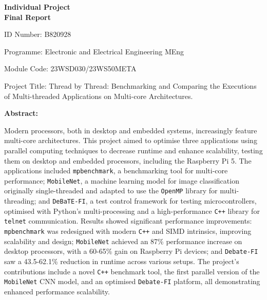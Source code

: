 \documentclass[12pt, openany]{book}
\begin{document}
\begin{titlepage}
	\thispagestyle{fancy} %
	
	\centering
	\vspace*{0cm} %
	{\Huge\bfseries Individual Project\\[0.5cm] Final Report\par}
	\vspace{2cm}
	\raggedright
	ID Number: B820928\par
	
	Programme: Electronic and Electrical Engineering MEng\par
	
	Module Code: 23WSD030/23WS50META\par
	
	Project Title: Thread by Thread: Benchmarking and Comparing the Executions of Multi-threaded Applications on Multi-core Architectures.\par
	
	\textbf{Abstract:}\par %

	Modern processors, both in desktop and embedded systems, increasingly feature multi-core architectures. This project aimed to optimise three applications using parallel computing techniques to decrease runtime and enhance scalability, testing them on desktop and embedded processors, including the Raspberry Pi 5. The applications included \texttt{mpbenchmark}, a benchmarking tool for multi-core performance; \texttt{MobileNet}, a machine learning model for image classification originally single-threaded and adapted to use the \texttt{OpenMP} library for multi-threading; and \texttt{DeBaTE-FI}, a test control framework for testing microcontrollers, optimised with Python’s multi-processing and a high-performance \texttt{C++} library for \texttt{telnet} communication. Results showed significant performance improvements: \texttt{mpbenchmark} was redesigned with modern \texttt{C++} and SIMD intrinsics, improving scalability and design; \texttt{MobileNet} achieved an 87\% performance increase on desktop processors, with a 60-65\% gain on Raspberry Pi devices; and \texttt{Debate-FI} saw a 43.5-62.1\% reduction in runtime across various setups. The project's contributions include a novel \texttt{C++} benchmark tool, the first parallel version of the \texttt{MobileNet} CNN model, and an optimised \texttt{Debate-FI} platform, all demonstrating enhanced performance scalability.

\end{titlepage}
\end{document}
